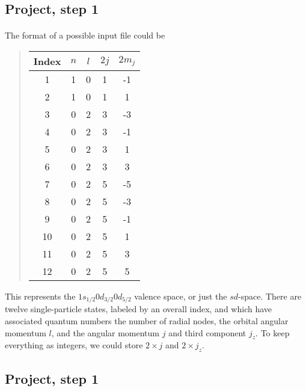 \documentclass[%
twoside,                 %
final,                   %
10pt]{article}
\begin{document}
\noindent



\subsection{Project, step 1}

\paragraph{}
The format of a possible input  file could be

\begin{quote}
\begin{tabular}{ccccc}
\hline
\multicolumn{1}{c}{ Index } & \multicolumn{1}{c}{ $n$ } & \multicolumn{1}{c}{ $l$ } & \multicolumn{1}{c}{ $2j$ } & \multicolumn{1}{c}{ $2m_j$ } \\
\hline
1     & 1   & 0   & 1    & -1     \\
2     & 1   & 0   & 1    & 1      \\
3     & 0   & 2   & 3    & -3     \\
4     & 0   & 2   & 3    & -1     \\
5     & 0   & 2   & 3    & 1      \\
6     & 0   & 2   & 3    & 3      \\
7     & 0   & 2   & 5    & -5     \\
8     & 0   & 2   & 5    & -3     \\
9     & 0   & 2   & 5    & -1     \\
10    & 0   & 2   & 5    & 1      \\
11    & 0   & 2   & 5    & 3      \\
12    & 0   & 2   & 5    & 5      \\
\hline
\end{tabular}
\end{quote}

\noindent
This represents the $1s_{1/2}0d_{3/2}0d_{5/2}$ valence space, or just the $sd$-space.  There are 
twelve single-particle states, labeled by an overall index, and which have associated quantum 
numbers the number of radial nodes, the orbital angular momentum $l$, and the 
angular momentum $j$ and third component $j_z$.  To keep everything as integers, we could store $2 \times j$ and 
$2 \times j_z$.



\subsection{Project, step 1}
\end{document}
